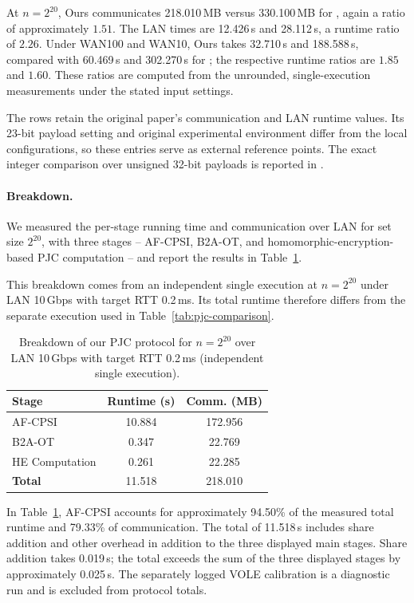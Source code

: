 At $n=2^{20}$, Ours communicates 218.010\,MB versus
330.100\,MB for \cite{KLS26}, again a ratio of approximately $1.51$.
The LAN times are 12.426\,s and 28.112\,s, a runtime ratio of $2.26$.
Under WAN100 and WAN10, Ours takes 32.710\,s and 188.588\,s, compared
with 60.469\,s and 302.270\,s for \cite{KLS26}; the respective runtime
ratios are $1.85$ and $1.60$. These ratios are computed from the
unrounded, single-execution measurements under the stated input settings.

The \cite{CHI+23} rows retain the original paper's communication
and LAN runtime values. Its 23-bit payload setting and original
experimental environment differ from the local configurations, so
these entries serve as external reference points. The exact integer
comparison over unsigned 32-bit payloads is reported in
.


\paragraph{Breakdown.}

We measured the per-stage running time and communication
over LAN for set size $2^{20}$, with three stages
-- AF-CPSI, B2A-OT, and homomorphic-encryption-based PJC computation --
and report the results in Table~\ref{tab:pjc-breakdown}.

This breakdown comes from an independent single execution at
$n=2^{20}$ under LAN 10\,Gbps with target RTT 0.2\,ms. Its total
runtime therefore differs from the separate execution used in
Table~\ref{tab:pjc-comparison}.

\begin{table}[!htbp]
\centering
\caption{Breakdown of our PJC protocol for $n=2^{20}$ over LAN 10\,Gbps with target RTT 0.2\,ms (independent single execution).}
\label{tab:pjc-breakdown}
\small
\setlength{\tabcolsep}{4pt}
\begin{tabular}{lcc}
\toprule
\textbf{Stage}
&
\textbf{Runtime (s)}
&
\textbf{Comm. (MB)}
\\
\midrule
AF-CPSI & 10.884 & 172.956 \\
B2A-OT & 0.347 & 22.769 \\
HE Computation & 0.261 & 22.285 \\
\midrule
\textbf{Total} & 11.518 & 218.010 \\
\bottomrule
\end{tabular}
\end{table}

In Table~\ref{tab:pjc-breakdown}, AF-CPSI accounts for approximately
94.50\% of the measured total runtime and 79.33\% of communication.
The total of 11.518\,s includes share addition and other overhead in
addition to the three displayed main stages. Share addition takes
0.019\,s; the total exceeds the sum of the three displayed stages by
approximately 0.025\,s. The separately logged VOLE calibration is a
diagnostic run and is excluded from protocol totals. 

